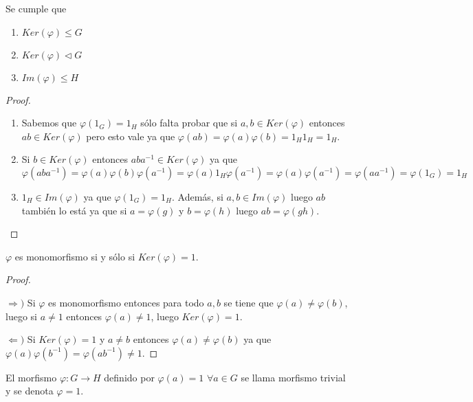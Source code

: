 \begin{obs}
Se cumple que
\begin{enumerate}
\item $Ker(\varphi) \leq G$
\item $Ker(\varphi) \triangleleft G$
\item $Im(\varphi) \leq H$
\end{enumerate}
\end{obs}

\begin{proof}
$ $

\begin{enumerate}
\item Sabemos que $\varphi(1_G) = 1_H$ s\'olo falta probar que si $a,b \in Ker(\varphi)$ entonces $ab \in Ker(\varphi)$ pero esto vale ya que $\varphi(ab) = \varphi(a) \varphi(b) = 1_H1_H = 1_H$.
\item Si $b \in Ker(\varphi)$ entonces $aba^{-1} \in Ker(\varphi)$ ya que $\varphi(aba^{-1}) = \varphi(a) \varphi(b) \varphi(a^{-1}) = \varphi(a) 1_H \varphi(a^{-1}) = \varphi(a) \varphi(a^{-1}) = \varphi(aa^{-1}) = \varphi(1_G) = 1_H$
\item $1_H \in Im(\varphi)$ ya que $\varphi(1_G) = 1_H$. Adem\'as, si $a, b \in Im(\varphi)$ luego $ab$ tambi\'en lo est\'a ya que si $a = \varphi(g)$ y $b = \varphi(h)$ luego $ab = \varphi(gh)$.
\end{enumerate}
\end{proof}

\begin{obs}
$\varphi$ es monomorfismo si y s\'olo si $Ker(\varphi) = 1$.
\end{obs}

\begin{proof}
$ $

$\Rightarrow )$ Si $\varphi$ es monomorfismo entonces para todo $a, b$ se tiene que $\varphi(a) \neq \varphi(b)$, luego si $a \neq 1$ entonces $\varphi(a) \neq 1$, luego $Ker(\varphi) = 1$.

$\Leftarrow )$ Si $Ker(\varphi) = 1$ y $a \neq b$ entonces $\varphi(a) \neq \varphi(b)$ ya que $\varphi(a) \varphi(b^{-1}) = \varphi(ab^{-1}) \neq 1$.
\end{proof}

\begin{defn}
El morfismo $\varphi: G \rightarrow H$ definido por $\varphi(a) = 1 \, \, \forall a \in G$ se llama morfismo trivial y se denota $\varphi = 1$.
\end{defn}

